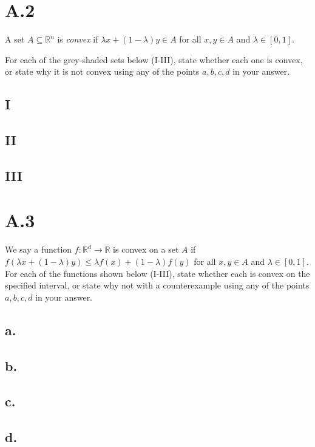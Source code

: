 \documentclass{article}
\newcommand{\field}[1]{\mathbb{#1}}
\newcommand{\1}{\mathbf{1}}
\newcommand{\R}{\field{R}} %
\begin{document}
\section*{A.2}
{\Large 

A set $A \subseteq \R^n$ is \emph{convex} if $\lambda x + (1-\lambda) y \in A$ for all $x,y\in A$ and $\lambda \in [0,1]$.

For each of the grey-shaded sets below (I-III), state whether each one is convex, or state why it is not convex using any of the points $a,b,c,d$ in your answer. 

\subsection*{I}

\subsection*{II}

\subsection*{III}

}

\section*{A.3}
{\Large 

We say a function $f: \R^d \rightarrow \R$ is convex on a set $A$ if $f(\lambda x + (1-\lambda) y) \leq \lambda f(x) + (1-\lambda) f(y)$ for all $x,y\in A$ and $\lambda \in [0,1]$. For each of the functions shown below (I-III), state whether each is convex on the specified interval, or state why not with a counterexample using any of the points $a,b,c,d$ in your answer.

\subsection*{a.}

\subsection*{b.}

\subsection*{c.}

\subsection*{d.}

}
\end{document}

